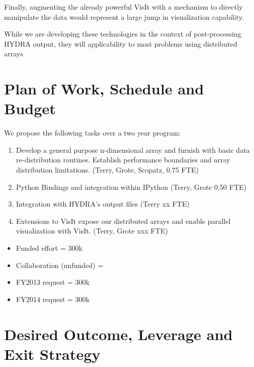 \documentclass[letterpaper,11pt]{article}
\begin{document}
Finally, augmenting the already powerful VisIt with a mechanism to directly manipulate the data would represent a large jump in visualization capability.

While we are developing these technologies in the context of post-processing HYDRA output, they will applicability to most problems using distributed arrays.




\section*{Plan of Work, Schedule and Budget}

We propose the following tasks over a two year program:

\begin{enumerate}
	\item Develop a general purpose n-dimensional array and furnish with basic data re-distribution routines.  Establish performance boundaries and array distribution limitations. (Terry, Grote, Scopatz, 0.75 FTE) 

	\item Python Bindings and integration within IPython (Terry, Grote 0.50 FTE)

	\item Integration with HYDRA's output files (Terry xx FTE)

	\item Extensions to VisIt expose our distributed arrays and enable parallel visualization with VisIt. (Terry, Grote xxx FTE)

\end{enumerate}

\begin{itemize}
	\setlength{\itemsep}{0pt}
	\setlength{\parskip}{0pt}
	\setlength{\parsep}{0pt}

	\item Funded effort = 300k
	\item Collaboration (unfunded) =
	\item FY2013 request =  300k
	\item FY2014 request =  300k
\end{itemize}


\section*{Desired Outcome, Leverage and Exit Strategy}
\end{document}
